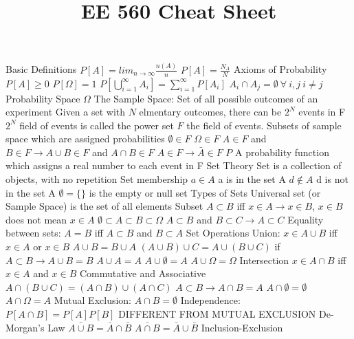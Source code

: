 \documentclass[14pt]{extarticle}
\title{EE 560 Cheat Sheet}
\begin{document}
	\maketitle
	
	\begin{outline}		
		\1	Basic Definitions
			\2	$P[A] = lim_{n \rightarrow \infty} \frac{n(A)}{n}$
			\2	$P[A] = \frac{N_A}{N}$
			\2	Axioms of Probability
				\3	$P[A] \ge 0$
				\3	$P[\Omega] = 1$
				\3	$P[\bigcup_{i=1}^{\infty} A_i] = \sum_{i=1}^{\infty} P[A_i]$
					\4	$A_i \cap A_j = \emptyset~\forall~i,j~i \ne j$
			\2	Probability Space
				\3	$\Omega$ The Sample Space:	Set of all possible outcomes of an experiment
					\4	Given a set with $N$ elmentary outcomes, there can be $2^N$ events in F
					\4	$2^N$ field of events is called the power set
				\3	$F$ the field of events.  Subsets of sample space which are assigned probabilities
					\4	$\emptyset \in F$
					\4	$\Omega \in F$
					\4	$A \in F$ and $B \in F \rightarrow A\cup B \in F$ and $A \cap B \in F$
					\4	$A \in F \rightarrow \bar{A} \in F$
				\3	$P$ A probability function which assigns a real number to each event in F
		\1	Set Theory
			\2	Set is a collection of objects, with no repetition
			\2	Set membership
				\3	$a \in A$ a is in the set A
				\3	$d \notin A$ d is not in the set A
				\3	$\emptyset = \{\}$ is the empty or null set
			\2	Types of Sets
				\3	Universal set (or Sample Space) is the set of all elements
				\3	Subset
					\4	$A \subset B$ iff $x \in A \rightarrow x \in B$, $x \in B$ does not mean $x \in A$
					\4	$\emptyset \subset A \subset B \subset \Omega$
					\4	$A \subset B$ and $B \subset C \rightarrow A \subset C$
				\3	Equality between sets: $A = B$ iff $A \subset B$ and $B \subset A$
			\2	Set Operations
				\3	Union:	$x \in A \cup B$ iff $x \in A$ or $x \in B$
					\4	$A \cup B = B \cup A$
					\4	$(A \cup B) \cup C = A \cup (B \cup C)$
					\4	if $A \subset B \rightarrow A \cup B = B$
					\4	$A \cup A = A$
					\4	$A \cup \emptyset = A$
					\4	$A \cup \Omega = \Omega$
				\3	Intersection
					\4	$x \in A \cap B$ iff $x \in A$ and $x \in B$
					\4	Commutative and Associative
					\4	$A \cap (B \cup C) = (A \cap B) \cup (A \cap C)$
					\4	$A \subset B \rightarrow A \cap B = A$
					\4	$A \cap \emptyset = \emptyset$
					\4	$A \cap \Omega = A$
			\2	Mutual Exclusion: $A \cap B = \emptyset$
			\2	Independence:	$P[A \cap B] = P[A]P[B]$ DIFFERENT FROM MUTUAL EXCLUSION
			\2	De-Morgan's Law
				\3	$\bar{A \cup B} = \bar{A} \cap \bar{B}$
				\3	$\bar{A \cap B} = \bar{A} \cup \bar{B}$
			\2	Inclusion-Exclusion

\end{outline}
\end{document}
